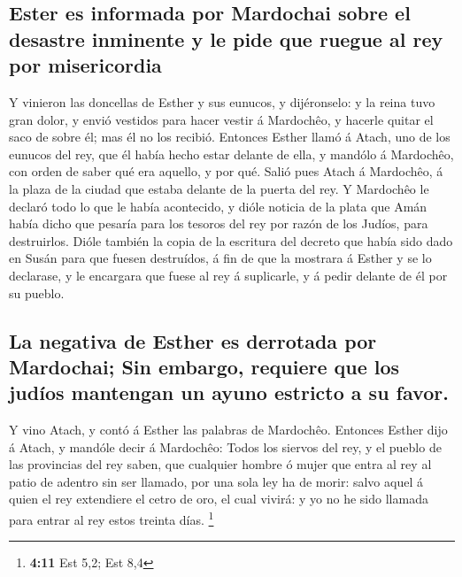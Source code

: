 \hypertarget{ester-es-informada-por-mardochai-sobre-el-desastre-inminente-y-le-pide-que-ruegue-al-rey-por-misericordia}{%
\subsection{Ester es informada por Mardochai sobre el desastre inminente
y le pide que ruegue al rey por
misericordia}\label{ester-es-informada-por-mardochai-sobre-el-desastre-inminente-y-le-pide-que-ruegue-al-rey-por-misericordia}}

 Y vinieron las doncellas de Esther y sus eunucos, y
dijéronselo: y la reina tuvo gran dolor, y envió vestidos para hacer
vestir á Mardochêo, y hacerle quitar el saco de sobre él; mas él no los
recibió.  Entonces Esther llamó á Atach, uno de los eunucos
del rey, que él había hecho estar delante de ella, y mandólo á
Mardochêo, con orden de saber qué era aquello, y por qué. 
Salió pues Atach á Mardochêo, á la plaza de la ciudad que estaba delante
de la puerta del rey.  Y Mardochêo le declaró todo lo que le
había acontecido, y dióle noticia de la plata que Amán había dicho que
pesaría para los tesoros del rey por razón de los Judíos, para
destruirlos.  Dióle también la copia de la escritura del
decreto que había sido dado en Susán para que fuesen destruídos, á fin
de que la mostrara á Esther y se lo declarase, y le encargara que fuese
al rey á suplicarle, y á pedir delante de él por su pueblo.

\hypertarget{la-negativa-de-esther-es-derrotada-por-mardochai-sin-embargo-requiere-que-los-juduxedos-mantengan-un-ayuno-estricto-a-su-favor.}{%
\subsection{La negativa de Esther es derrotada por Mardochai; Sin
embargo, requiere que los judíos mantengan un ayuno estricto a su
favor.}\label{la-negativa-de-esther-es-derrotada-por-mardochai-sin-embargo-requiere-que-los-juduxedos-mantengan-un-ayuno-estricto-a-su-favor.}}

 Y vino Atach, y contó á Esther las palabras de Mardochêo.
 Entonces Esther dijo á Atach, y mandóle decir á Mardochêo:
 Todos los siervos del rey, y el pueblo de las provincias
del rey saben, que cualquier hombre ó mujer que entra al rey al patio de
adentro sin ser llamado, por una sola ley ha de morir: salvo aquel á
quien el rey extendiere el cetro de oro, el cual vivirá: y yo no he sido
llamada para entrar al rey estos treinta días. \footnote{\textbf{4:11}
  Est 5,2; Est 8,4}

